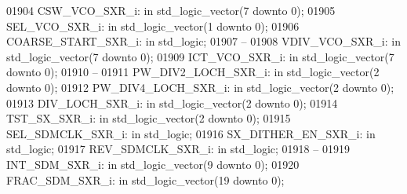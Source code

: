 \begin{DoxyCode}
01904     CSW\_VCO\_SXR\_i:  \textcolor{keywordflow}{in} \textcolor{comment}{std\_logic\_vector}(\textcolor{vhdllogic}{}\textcolor{vhdllogic}{7} \textcolor{keywordflow}{downto} \textcolor{vhdllogic}{}\textcolor{vhdllogic}{0});
01905     SEL\_VCO\_SXR\_i:  \textcolor{keywordflow}{in} \textcolor{comment}{std\_logic\_vector}(\textcolor{vhdllogic}{}\textcolor{vhdllogic}{1} \textcolor{keywordflow}{downto} \textcolor{vhdllogic}{}\textcolor{vhdllogic}{0});
01906     COARSE\_START\_SXR\_i: \textcolor{keywordflow}{in} \textcolor{comment}{std\_logic};
01907 \textcolor{keyword}{    --}
01908     VDIV\_VCO\_SXR\_i: \textcolor{keywordflow}{in} \textcolor{comment}{std\_logic\_vector}(\textcolor{vhdllogic}{}\textcolor{vhdllogic}{7} \textcolor{keywordflow}{downto} \textcolor{vhdllogic}{}\textcolor{vhdllogic}{0});
01909     ICT\_VCO\_SXR\_i:  \textcolor{keywordflow}{in} \textcolor{comment}{std\_logic\_vector}(\textcolor{vhdllogic}{}\textcolor{vhdllogic}{7} \textcolor{keywordflow}{downto} \textcolor{vhdllogic}{}\textcolor{vhdllogic}{0});
01910 \textcolor{keyword}{    --}
01911     PW\_DIV2\_LOCH\_SXR\_i: \textcolor{keywordflow}{in} \textcolor{comment}{std\_logic\_vector}(\textcolor{vhdllogic}{}\textcolor{vhdllogic}{2} \textcolor{keywordflow}{downto} \textcolor{vhdllogic}{}\textcolor{vhdllogic}{0});
01912     PW\_DIV4\_LOCH\_SXR\_i: \textcolor{keywordflow}{in} \textcolor{comment}{std\_logic\_vector}(\textcolor{vhdllogic}{}\textcolor{vhdllogic}{2} \textcolor{keywordflow}{downto} \textcolor{vhdllogic}{}\textcolor{vhdllogic}{0});
01913     DIV\_LOCH\_SXR\_i: \textcolor{keywordflow}{in} \textcolor{comment}{std\_logic\_vector}(\textcolor{vhdllogic}{}\textcolor{vhdllogic}{2} \textcolor{keywordflow}{downto} \textcolor{vhdllogic}{}\textcolor{vhdllogic}{0});
01914     TST\_SX\_SXR\_i:   \textcolor{keywordflow}{in} \textcolor{comment}{std\_logic\_vector}(\textcolor{vhdllogic}{}\textcolor{vhdllogic}{2} \textcolor{keywordflow}{downto} \textcolor{vhdllogic}{}\textcolor{vhdllogic}{0});
01915     SEL\_SDMCLK\_SXR\_i:   \textcolor{keywordflow}{in} \textcolor{comment}{std\_logic};
01916     SX\_DITHER\_EN\_SXR\_i: \textcolor{keywordflow}{in} \textcolor{comment}{std\_logic};
01917     REV\_SDMCLK\_SXR\_i:   \textcolor{keywordflow}{in} \textcolor{comment}{std\_logic};
01918 \textcolor{keyword}{    --}
01919     INT\_SDM\_SXR\_i:  \textcolor{keywordflow}{in} \textcolor{comment}{std\_logic\_vector}(\textcolor{vhdllogic}{}\textcolor{vhdllogic}{9} \textcolor{keywordflow}{downto} \textcolor{vhdllogic}{}\textcolor{vhdllogic}{0});
01920     FRAC\_SDM\_SXR\_i: \textcolor{keywordflow}{in} \textcolor{comment}{std\_logic\_vector}(\textcolor{vhdllogic}{}\textcolor{vhdllogic}{19} \textcolor{keywordflow}{downto} \textcolor{vhdllogic}{}\textcolor{vhdllogic}{0});

\end{DoxyCode}
